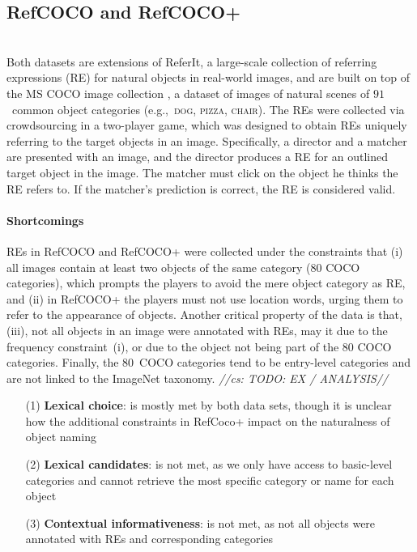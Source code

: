 \documentclass[runningheads]{llncs}
\newcommand{\cs}[1]{\textcolor{PineGreen}{\emph{//cs: #1//}}}
\newcommand{\referit}{ReferIt\xspace}
\newcommand{\refcoco}{RefCOCO\xspace}
\newcommand{\refcocop}{RefCOCO+\xspace}
\newcommand{\cat}[1]{\textsc{#1}}
\begin{document}

\subsection{\refcoco and \refcocop \cite{Yu2016}}~\\ 
Both datasets are extensions of \referit\cite{Kazemzadeh2014}, a large-scale collection of referring expressions (RE) for natural objects in real-world images, and are built on top of the MS COCO image collection \cite{mscoco}, 
a dataset of images of natural scenes of $91$~common object categories (e.g.,~\cat{dog, pizza, chair}). 
The REs were collected via crowdsourcing in a two-player game, which was designed to obtain REs uniquely referring to the target objects in an image. 
Specifically, a director and a matcher are presented with an image, and the director produces a RE for an outlined target object in the image. 
The matcher must click on the object he thinks the RE refers to. %
If the matcher's prediction is correct, the RE is considered valid.


\paragraph{Shortcomings}
REs in \refcoco and \refcocop were collected under the constraints that (i) all images contain at least two objects of the same category (80 COCO categories), which prompts the players to avoid the mere object category as RE, and (ii) in \refcocop the players must not use location words, urging them to refer to the appearance of objects. 
Another critical property of the data is that, (iii), not all objects in an image were annotated with REs, may it due to the frequency constraint~(i), or due to the object not being part of the 80 COCO categories. 
Finally, the $80$~COCO categories tend to be entry-level categories and are not linked to the ImageNet taxonomy. \cs{TODO: EX / ANALYSIS}

\begin{itemize}
        \item[(1)] \textbf{Lexical choice}: is mostly met by both data sets, though it is unclear how the additional constraints in RefCoco+ impact on the naturalness of object naming
		\item[(2)] \textbf{Lexical candidates}: is not met, as we only have access to basic-level categories and cannot retrieve the  most specific category or name for each object
		\item[(3)] \textbf{Contextual informativeness}: is not met, as not all objects were annotated with REs and corresponding categories
\end{itemize}
\end{document}
